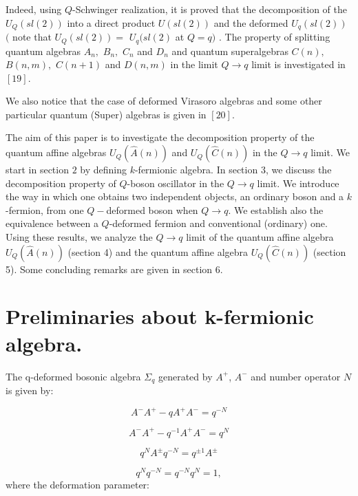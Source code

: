 \documentclass[a4paper,12pt,thmsa]{article}
\begin{document}
Indeed, using $Q$-Schwinger realization, it is proved that the decomposition
of the $U_Q(sl(2))$ into a direct product $U(sl(2))$ and the deformed $%
U_q(sl(2))$ $($ note that $U_Q(sl(2))=$ $U_q(sl(2)$ at $Q=q)$ . The property
of splitting quantum algebras $A_n,$ $B_n,$ $C_n$ and $D_n$ and quantum
superalgebras $C(n),$ $B(n,m),$ $C(n+1)$ and $D(n,m)$ in the limit $%
Q\rightarrow q$ limit is investigated in $[19]$.

We also notice that the case of deformed Virasoro algebras and some other
particular quantum (Super) algebras is given in $[20]$.

The aim of this paper is to investigate the decomposition property of the
quantum affine algebras $U_Q(\hat A(n))$ and $U_Q(\hat C(n))$ in the $%
Q\rightarrow q$ limit. We start in section $2$ by defining $k$-fermionic
algebra. In section $3$, we discuss the decomposition property of $Q$-boson
oscillator in the $Q\rightarrow q$ limit. We introduce the way in which one
obtains two independent objects, an ordinary boson and a $k$-fermion, from
one $Q-$deformed boson when $Q\rightarrow q$. We establish also the
equivalence between a $Q$-deformed fermion and conventional (ordinary) one.
Using these results, we analyze the $Q\rightarrow q$ limit of the quantum
affine algebra $U_Q(\hat A(n))$ (section 4) and the quantum affine algebra $%
U_Q(\widehat{C}(n))$ (section 5). Some concluding remarks are given in
section $6.$

\section{Preliminaries about k-fermionic algebra.}

The q-deformed bosonic algebra $\Sigma _q$ generated by $A^{+}$, $A^{-}$ and
number operator $N$ is given by:

\begin{equation}
A^{-}A^{+}-qA^{+}A^{-}=q^{-N}
\end{equation}

\begin{equation}
A^{-}A^{+}-q^{-1}A^{+}A^{-}=q^N
\end{equation}

\begin{equation}
q^NA^{\pm }q^{-N}=q^{\pm 1}A^{\pm }
\end{equation}

\begin{equation}
q^Nq^{-N}=q^{-N}q^N=1,
\end{equation}
where the deformation parameter:
\end{document}
